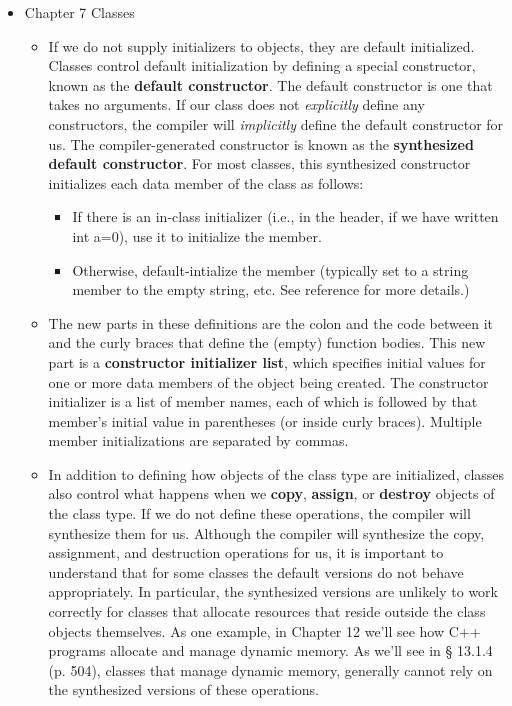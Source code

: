 \documentclass[twoside,english]{uiofysmaster}
\begin{document}
\begin{itemize}
	\item Chapter 7 Classes
	\begin{itemize}
		\item If we do not supply initializers to objects, they are default initialized. Classes control default initialization by defining a special constructor, known as the \textbf{default constructor}. The default constructor is one that takes no arguments. If our class does not \textit{explicitly} define any constructors, the compiler will \textit{implicitly} define the default constructor for us. The compiler-generated constructor is known as the \textbf{synthesized default constructor}. For most classes, this synthesized constructor initializes each data member of the class as follows:
		\begin{itemize}
			\item If there is an in-class initializer (i.e., in the header, if we have written int a=0), use it to initialize the member.
			\item Otherwise, default-intialize the member (typically set to a string member to the empty string, etc. See reference for more details.)
		\end{itemize}
		\item The new parts in these definitions are the colon and the code between it and the curly braces that define the (empty) function bodies. This new part is a \textbf{constructor initializer list}, which specifies initial values for one or more data members of the object being created. The constructor initializer is a list of member names, each of which is followed by that member’s initial value in parentheses (or inside curly braces). Multiple member initializations are separated by commas.
		\item In addition to defining how objects of the class type are initialized, classes also control what happens when we \textbf{copy}, \textbf{assign}, or \textbf{destroy} objects of the class type. If we do not define these operations, the compiler will synthesize them for us. Although the compiler will synthesize the copy, assignment, and destruction operations for us, it is important to understand that for some classes the default versions do not behave appropriately. In particular, the synthesized versions are unlikely to work correctly for classes that allocate resources that reside outside the class objects themselves. As one example, in Chapter 12 we’ll see how C++ programs allocate and manage dynamic memory. As we’ll see in § 13.1.4 (p. 504), classes that manage dynamic memory, generally cannot rely on the synthesized versions of these operations. 

\end{itemize}
\end{itemize}
\end{document}
